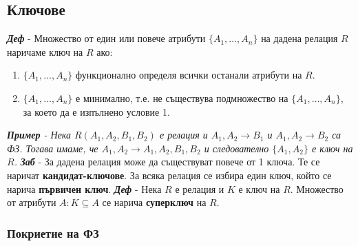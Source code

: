 \documentclass[fleqn,12pt]{article}
\begin{document}
\subsection{Ключове}

\textbf{\textit{Деф}} - Множество от един или повече атрибути $\{A_1, \dots, A_n\}$ на дадена релация $R$ наричаме ключ на $R$ ако:
\begin{enumerate}
    \item $\{A_1, \dots, A_n\}$ функционално определя всички останали атрибути на $R$.
    \item $\{A_1, \dots, A_n\}$ е минимално, т.е. не съществува подмножество на $\{A_1, \dots, A_n\}$, за което да е изпълнено условие 1.
\end{enumerate}
\bigbreak
\textit{\textbf{Пример} - Нека $R(A_1, A_2, B_1, B_2)$ е релация и $A_1, A_2 \rightarrow B_1$ и $A_1, A_2 \rightarrow B_2$ са ФЗ.
Тогава имаме, че $A_1, A_2 \rightarrow A_1, A_2, B_1, B_2$ и следователно $\{A_1, A_2\}$ е ключ на $R$.}
\bigbreak
\textbf{\textit{Заб}} - За дадена релация може да съществуват повече от 1 ключа.
Те се наричат \textbf{кандидат-ключове}.
За всяка релация се избира един ключ, който се нарича \textbf{първичен ключ}.
\bigbreak
\textbf{\textit{Деф}} - Нека $R$ е релация и $K$ е ключ на $R$. Множество от атрибути $A: K \subseteq A$ се нарича \textbf{суперключ} на $R$.

\subsubsection{Покриетие на ФЗ}
\end{document}
